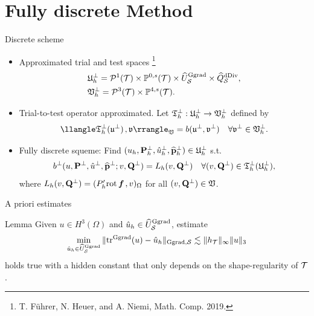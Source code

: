 \documentclass[10pt]{beamer}
\begin{document}
\section{Fully discrete Method}
\begin{frame}{Discrete scheme}
 \begin{itemize}
     \item Approximated trial and test spaces \footnote[1]{T. F\"uhrer, N. Heuer, and A. Niemi, Math. Comp. 2019.  }
     \begin{align*}
         &\mathfrak{U}^\perp_h =\mathcal{P}^1(\mathcal{T}) \times \mathbb{P}^{0,s}(\mathcal{T})\times \widehat{U}^{\mathrm{Ggrad}}_{\mathcal{S}} \times \widehat{Q}^{\mathrm{dDiv}}_{\mathcal{S}},   \\
         &\mathfrak{V}^\perp_h = \mathcal{P}^3(\mathcal{T}) \times \mathbb{P}^{4,s}(\mathcal{T}).
     \end{align*}
     \item  Trial-to-test operator approximated. Let ${\mathfrak{T}}_h^\perp:\mathfrak{U}_h^\perp \to \mathfrak{V}_h^\perp $ defined by
    \begin{align*}
        \ip{\ttt^\perp_h(\uu^\perp)}{\vv}_{\VV}=b(\uu^\perp,\vv^\perp) \quad \forall \vv^\perp \in \VV_h^\perp.
    \end{align*}
     \item Fully discrete squeme: Find $(u_h,\mathbf{P}^\perp_h,{\hat u}^\perp_h,\widehat{\mathbf{p}}^\perp_h) \in \mathfrak{U}^\perp_h$ s.t.
     \begin{align*}
     b^\perp(u,\mathbf{P}^\perp,{\hat u}^\perp,\widehat{\mathbf{p}}^\perp;v,\mathbf{Q}^\perp)=L_h(v,\mathbf{Q}^\perp) \quad \forall (v,\mathbf{Q}^\perp) \in{\mathfrak{T}}_h^\perp(\mathfrak{U}_h^\perp),
     \end{align*}
     where $L_h(v,\mathbf{Q}^\perp)=(P_h'{\rm rot\,} \boldsymbol{f}\hspace*{.5mm},v)_\Omega$ for all $(v,\mathbf{Q}^\perp) \in \mathfrak{V}$. 
 \end{itemize}   
\end{frame}
\begin{frame}{A priori estimates}
    \begin{block}{Lemma} Given $u \in H^3(\Omega)$ and ${\hat u}_h \in \widehat{U}^{\mathrm{Ggrad}}_{\mathcal{S}}$, estimate 
        \begin{align*}
            \min_{{\hat u}_h \in \widehat{U}^{\mathrm{Ggrad}}_{\mathcal{S}}}
   \|\mathrm{tr}_{}^{\mathrm{Ggrad}}(u) - {\hat u}_h\|_{\mathrm{Ggrad},\mathcal{S}} \lesssim \|h_{\mathcal{T}}\|_\infty \|u\|_{3}
        \end{align*}
    holds true with a hidden constant that only depends on the shape-regularity of $\mathcal{T}$.    
    \end{block}
\end{frame}
\end{document}
